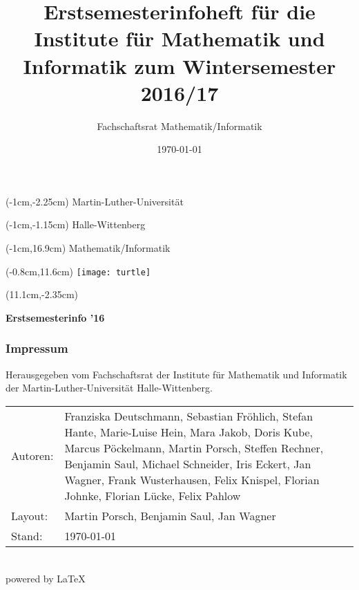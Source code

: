 
\thispagestyle{empty}
\title{Erstsemesterinfoheft für die Institute für Mathematik und Informatik zum
       Wintersemester 2016/17}
\author{Fachschaftsrat Mathematik/Informatik}
\date{\today}

\fontsize{1.05cm}{1cm}
\begin{textblock*}{\paperwidth}(-1cm,-2.25cm)
 \textsf{Martin-Luther-Universität}
\end{textblock*}
\begin{textblock*}{\paperwidth}(-1cm,-1.15cm)
 \textsf{Halle-Wittenberg}
\end{textblock*}
\begin{textblock*}{\paperwidth}(-1cm,16.9cm)
 \textsf{Mathematik/Informatik}
\end{textblock*}
\begin{textblock*}{\paperwidth}(-0.8cm,11.6cm)
 \texttt{[image: turtle]}
\end{textblock*}
\fontsize{2.06cm}{1cm}
\begin{textblock*}{\paperwidth}(11.1cm,-2.35cm)
 \begin{sideways}
  \textsf{\textbf{Erstsemesterinfo ’16}}
 \end{sideways}
\end{textblock*}
\normalsize

\newpage
\thispagestyle{empty}
\subsubsection{Impressum}
Herausgegeben vom Fachschaftsrat der Institute für Mathematik und Informatik der
Martin-Luther-Universität Halle-Wittenberg.\\[1.0em]
\begin{tabularx}{\textwidth}{@{}lX}
 Autoren: & Franziska Deutschmann,                                              %
            Sebastian Fröhlich,
            Stefan Hante,
            Marie-Luise Hein,
            Mara Jakob,
            Doris Kube,
            Marcus Pöckelmann,
            Martin Porsch,
            Steffen Rechner,
            Benjamin Saul,
            Michael Schneider,
            Iris Eckert,
            Jan Wagner,
            Frank Wusterhausen,
            Felix Knispel,
            Florian Johnke,
            Florian Lücke,
            Felix Pahlow\\
 Layout:  & Martin Porsch, Benjamin Saul, Jan Wagner\\
 Stand:   & \today\\
\end{tabularx}\\[1.0em]
powered by \LaTeX
\pagebreak

